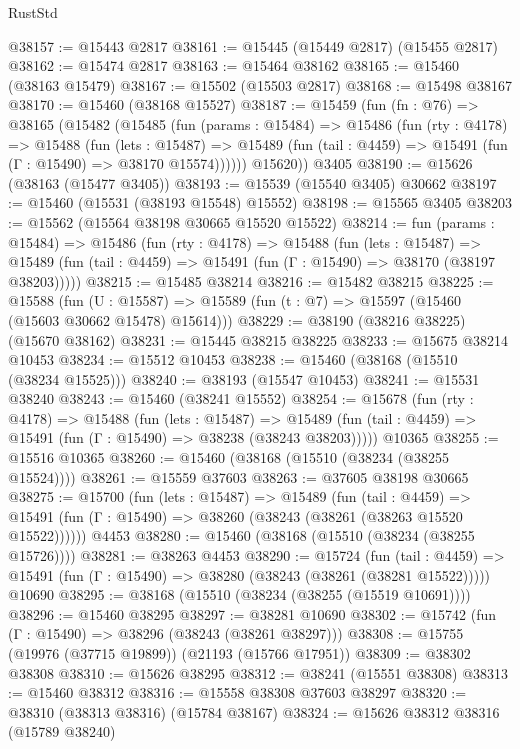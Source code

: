 \begin{lexlean}{RustStd}
\begin{coremodule}
@38157 := @15443 @2817
@38161 := @15445 (@15449 @2817) (@15455 @2817)
@38162 := @15474 @2817
@38163 := @15464 @38162
@38165 := @15460 (@38163 @15479)
@38167 := @15502 (@15503 @2817)
@38168 := @15498 @38167
@38170 := @15460 (@38168 @15527)
@38187 := @15459
    (fun (fn : @76) =>
    @38165
      (@15482
        (@15485
          (fun (params : @15484) =>
          @15486
            (fun (rty : @4178) =>
            @15488
              (fun (lets : @15487) =>
              @15489 (fun (tail : @4459) => @15491 (fun (Γ : @15490) => @38170 @15574))))))
        @15620))
    @3405
@38190 := @15626 (@38163 (@15477 @3405))
@38193 := @15539 (@15540 @3405) @30662
@38197 := @15460 (@15531 (@38193 @15548) @15552)
@38198 := @15565 @3405
@38203 := @15562 (@15564 @38198 @30665 @15520 @15522)
@38214 := fun (params : @15484) =>
  @15486
    (fun (rty : @4178) =>
    @15488
      (fun (lets : @15487) =>
      @15489 (fun (tail : @4459) => @15491 (fun (Γ : @15490) => @38170 (@38197 @38203)))))
@38215 := @15485 @38214
@38216 := @15482 @38215
@38225 := @15588
    (fun (U : @15587) => @15589 (fun (t : @7) => @15597 (@15460 (@15603 @30662 @15478) @15614)))
@38229 := @38190 (@38216 @38225) (@15670 @38162)
@38231 := @15445 @38215 @38225
@38233 := @15675 @38214 @10453
@38234 := @15512 @10453
@38238 := @15460 (@38168 (@15510 (@38234 @15525)))
@38240 := @38193 (@15547 @10453)
@38241 := @15531 @38240
@38243 := @15460 (@38241 @15552)
@38254 := @15678
    (fun (rty : @4178) =>
    @15488
      (fun (lets : @15487) =>
      @15489 (fun (tail : @4459) => @15491 (fun (Γ : @15490) => @38238 (@38243 @38203)))))
    @10365
@38255 := @15516 @10365
@38260 := @15460 (@38168 (@15510 (@38234 (@38255 @15524))))
@38261 := @15559 @37603
@38263 := @37605 @38198 @30665
@38275 := @15700
    (fun (lets : @15487) =>
    @15489
      (fun (tail : @4459) =>
      @15491 (fun (Γ : @15490) => @38260 (@38243 (@38261 (@38263 @15520 @15522))))))
    @4453
@38280 := @15460 (@38168 (@15510 (@38234 (@38255 @15726))))
@38281 := @38263 @4453
@38290 := @15724
    (fun (tail : @4459) => @15491 (fun (Γ : @15490) => @38280 (@38243 (@38261 (@38281 @15522)))))
    @10690
@38295 := @38168 (@15510 (@38234 (@38255 (@15519 @10691))))
@38296 := @15460 @38295
@38297 := @38281 @10690
@38302 := @15742 (fun (Γ : @15490) => @38296 (@38243 (@38261 @38297)))
@38308 := @15755 (@19976 (@37715 @19899)) (@21193 (@15766 @17951))
@38309 := @38302 @38308
@38310 := @15626 @38295
@38312 := @38241 (@15551 @38308)
@38313 := @15460 @38312
@38316 := @15558 @38308 @37603 @38297
@38320 := @38310 (@38313 @38316) (@15784 @38167)
@38324 := @15626 @38312 @38316 (@15789 @38240)

\end{coremodule}
\end{lexlean}
